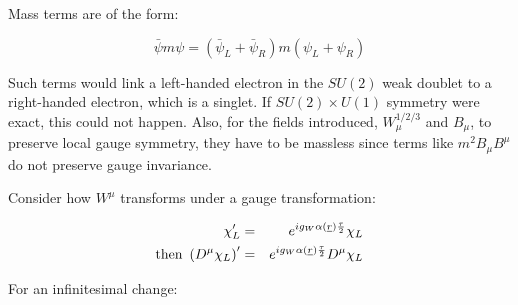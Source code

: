 Mass terms are of the form:

\[
  \bar{\psi}m\psi = \left(\bar{\psi}_L + \bar{\psi}_R\right)m\left(\psi_L + \psi_R\right)
\]

Such terms would link a left-handed electron in the $SU(2)$ weak doublet to a right-handed electron, which is a singlet.  If $SU(2) \times U(1)$ symmetry were exact, this could not happen.  Also, for the fields introduced, $W_{\mu}^{1/2/3}$ and $B_{\mu}$, to preserve local gauge symmetry, they have to be massless since terms like $m^2B_{\mu}B^{\mu}$ do not preserve gauge invariance.

Consider how $W^{\mu}$ transforms under a gauge transformation:

\begin{eqnarray*}
  \chi'_L & = & e^{ig_W\alpha(\underline{r})\frac{\tau}{2}}\chi_L \\
  \textrm{then } \left(D^{\mu}\chi_L\right)' & = & e^{ig_W\alpha(\underline{r})\frac{\tau}{2}}D^{\mu}\chi_L
\end{eqnarray*}

For an infinitesimal change:

